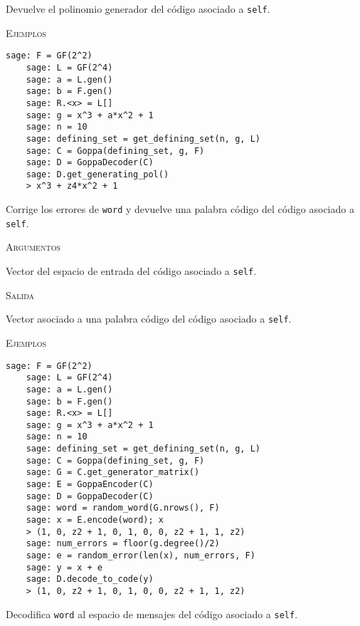 \begin{description}[leftmargin=1em, font=\normalfont\ttfamily, style=nextline]
\begin{description}[font=\ttfamily, style=nextline]
  \item[get\_generating\_pol(self)] Devuelve el polinomio generador del código asociado a \texttt{self}.

  \textsc{Ejemplos}
  \begin{lstlisting}[gobble=4]
    sage: F = GF(2^2)
    sage: L = GF(2^4)
    sage: a = L.gen()
    sage: b = F.gen()
    sage: R.<x> = L[]
    sage: g = x^3 + a*x^2 + 1
    sage: n = 10
    sage: defining_set = get_defining_set(n, g, L)
    sage: C = Goppa(defining_set, g, F)
    sage: D = GoppaDecoder(C)
    sage: D.get_generating_pol()
    > x^3 + z4*x^2 + 1
  \end{lstlisting}

  \item[decode\_to\_code(self, word)] Corrige los errores de \texttt{word} y devuelve una palabra código del código asociado a \texttt{self}.
      
  \textsc{Argumentos}
  \begin{description}[font=\normalfont\ttfamily]
      \item[word] Vector del espacio de entrada del código asociado a \texttt{self}.
  \end{description}

  \textsc{Salida}
  \begin{description}[font=\normalfont\ttfamily]
      \item[] Vector asociado a una palabra código del código asociado a \texttt{self}.
  \end{description}

  \textsc{Ejemplos}
  \begin{lstlisting}[gobble=4]
    sage: F = GF(2^2)
    sage: L = GF(2^4)
    sage: a = L.gen()
    sage: b = F.gen()
    sage: R.<x> = L[]
    sage: g = x^3 + a*x^2 + 1
    sage: n = 10
    sage: defining_set = get_defining_set(n, g, L)
    sage: C = Goppa(defining_set, g, F)
    sage: G = C.get_generator_matrix()
    sage: E = GoppaEncoder(C)
    sage: D = GoppaDecoder(C)
    sage: word = random_word(G.nrows(), F)
    sage: x = E.encode(word); x
    > (1, 0, z2 + 1, 0, 1, 0, 0, z2 + 1, 1, z2)
    sage: num_errors = floor(g.degree()/2)
    sage: e = random_error(len(x), num_errors, F)
    sage: y = x + e
    sage: D.decode_to_code(y)
    > (1, 0, z2 + 1, 0, 1, 0, 0, z2 + 1, 1, z2)
  \end{lstlisting}

  \item[decode\_to\_message(self, word)] Decodifica \texttt{word} al espacio de mensajes del código asociado a \texttt{self}.
      

\end{description}
\end{description}
